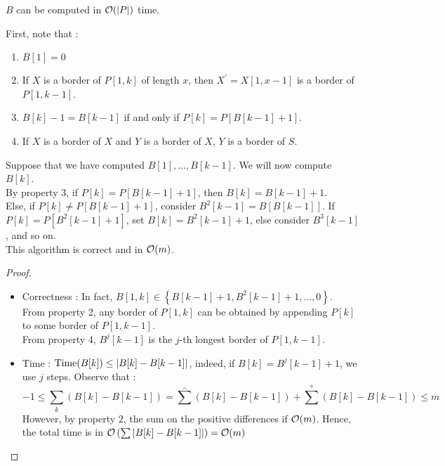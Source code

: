 \documentclass{cours}
\begin{document}
\begin{proposition}\label{lemma1KMP}
    $B$ can be computed in $\mathcal{O}(\left|P\right|)$ time.
\end{proposition}
\begin{lemma}
    First, note that : 
    \begin{enumerate}
        \item $B[1] = 0$
        \item If $X$ is a border of $P[1, k]$ of length $x$, then $X^{'} = X[1, x - 1]$ is a border of $P[1, k - 1]$.
        \item $B[k] - 1 = B[k - 1]$ if and only if $P[k] = P[B[k - 1] + 1]$.
        \item If $X$ is a border of $X$ and $Y$ is a border of $X$, $Y$ is a border of $S$. 
    \end{enumerate}
    Suppose that we have computed $B[1], \ldots, B[k - 1]$. We will now compute $B[k]$.\\
    By property 3, if $P[k] = P[B[k - 1] + 1]$, then $B[k] = B[k - 1] + 1$.\\
    Else, if $P[k] \neq P[B[k - 1] + 1]$, consider $B^{2}[k - 1] = B[B[k - 1]]$. If $P[k] = P[B^{2}[k - 1] + 1]$, set $B[k] = B^{2}[k - 1] + 1$, else consider $B^{3}[k - 1]$, and so on.\\

    This algorithm is correct and in $\mathcal{O}(m)$.
\end{lemma}
\begin{proof}
    \begin{itemize}
        \item Correctness : In fact, $B[1, k] \in \left\{B[k - 1] + 1, B^{2}[k - 1] + 1, \ldots, 0\right\}$.\\
        From property 2, any border of $P[1, k]$ can be obtained by appending $P[k]$ to some border of $P[1, k - 1]$.\\
        From property 4, $B^{j}[k - 1]$ is the $j$-th longest border of $P[1, k - 1]$.
        \item Time : $\textmd{Time}(B[k]) \leq \left|B[k] - B[k - 1]\right|$, indeed, if $B[k] = B^{j}[k - 1] + 1$, we use $j$ steps.
        Observe that : 
        \[
            -1 \leq \sum_{k}\left(B[k] - B[k - 1]\right) = \sum^{-}\left(B[k] - B[k - 1]\right) + \sum^{+}\left(B[k] - B[k - 1]\right) \leq m
        \]
        However, by property $2$, the sum on the positive differences if $\mathcal{O}(m)$. Hence, the total time is in $\mathcal{O}\left(\sum \left|B[k] - B[k - 1]\right|\right) = \mathcal{O}(m)$
    \end{itemize}
\end{proof}
\end{document}
